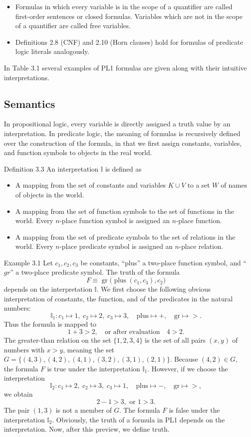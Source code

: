 \documentclass[10pt]{book}
\begin{document}
\begin{itemize}
  \item Formulas in which every variable is in the scope of a quantifier are called first-order sentences or closed formulas. Variables which are not in the scope of a quantifier are called free variables.
  \item Definitions 2.8 (CNF) and 2.10 (Horn clauses) hold for formulas of predicate logic literals analogously.
\end{itemize}
In Table 3.1 several examples of PL1 formulas are given along with their intuitive interpretations.

\subsection{Semantics}
In propositional logic, every variable is directly assigned a truth value by an interpretation. In predicate logic, the meaning of formulas is recursively defined over the construction of the formula, in that we first assign constants, variables, and function symbols to objects in the real world.

Definition 3.3 An interpretation $\mathbb{I}$ is defined as

\begin{itemize}
  \item A mapping from the set of constants and variables $K \cup V$ to a set $W$ of names of objects in the world.
  \item A mapping from the set of function symbols to the set of functions in the world. Every $n$-place function symbol is assigned an $n$-place function.
  \item A mapping from the set of predicate symbols to the set of relations in the world. Every $n$-place predicate symbol is assigned an $n$-place relation.
\end{itemize}

Example 3.1 Let $c_{1}, c_{2}, c_{3}$ be constants, ``plus'' a two-place function symbol, and ``$gr$'' a two-place predicate symbol. The truth of the formula
$$
F \equiv \operatorname{gr}\bigl(\operatorname{plus}(c_{1},c_{3}), c_{2}\bigr)
$$
depends on the interpretation $\mathbb{I}$. We first choose the following obvious interpretation of constants, the function, and of the predicates in the natural numbers:
$$
\mathbb{I}_{1}: c_{1} \mapsto 1,\; c_{2} \mapsto 2,\; c_{3} \mapsto 3, \quad \text{plus} \mapsto +, \quad \text{gr} \mapsto >.
$$
Thus the formula is mapped to
$$
1+3>2, \quad \text{or after evaluation} \quad 4>2.
$$
The greater-than relation on the set $\{1,2,3,4\}$ is the set of all pairs $(x,y)$ of numbers with $x>y$, meaning the set $G=\{(4,3),(4,2),(4,1),(3,2),(3,1),(2,1)\}$. Because $(4,2) \in G$, the formula $F$ is true under the interpretation $\mathbb{I}_{1}$. However, if we choose the interpretation
$$
\mathbb{I}_{2}: c_{1} \mapsto 2,\; c_{2} \mapsto 3,\; c_{3} \mapsto 1, \quad \text{plus} \mapsto -, \quad \text{gr} \mapsto >,
$$
we obtain
$$
2-1>3, \text{ or } 1>3.
$$
The pair $(1,3)$ is not a member of $G$. The formula $F$ is false under the interpretation $\mathbb{I}_{2}$. Obviously, the truth of a formula in PL1 depends on the interpretation. Now, after this preview, we define truth.
\end{document}
